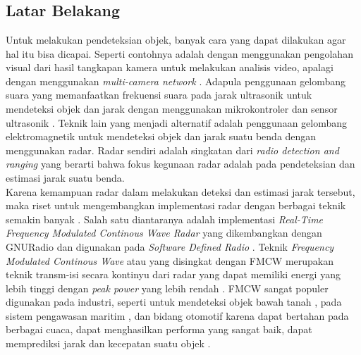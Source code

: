 \chapter{\babSatu}
\section{Latar Belakang}
Untuk melakukan pendeteksian objek, banyak cara yang dapat dilakukan agar hal itu bisa dicapai. Seperti contohnya adalah dengan menggunakan pengolahan visual dari hasil tangkapan kamera untuk melakukan analisis video, apalagi dengan menggunakan \textit{multi-camera network} \cite{Zhang2015}. Adapula penggunaan gelombang suara yang memanfaatkan frekuensi suara pada jarak ultrasonik untuk mendeteksi objek dan jarak dengan menggunakan mikrokontroler dan sensor ultrasonik \cite{Biswas2020}. Teknik lain yang menjadi alternatif adalah penggunaan gelombang elektromagnetik untuk mendeteksi objek dan jarak suatu benda dengan menggunakan radar. Radar sendiri adalah singkatan dari \textit{radio detection and ranging} yang berarti bahwa fokus kegunaan radar adalah pada pendeteksian dan estimasi jarak suatu benda.\\

Karena kemampuan radar dalam melakukan deteksi dan estimasi jarak tersebut, maka riset untuk mengembangkan implementasi radar dengan berbagai teknik semakin banyak \cite{Jia2020,Xia2021,MoraHuaman2020,Sundaresan2015}. Salah satu diantaranya adalah implementasi \textit{Real-Time Frequency Modulated Continous Wave Radar} yang dikembangkan dengan GNURadio dan digunakan pada \textit{Software Defined Radio} \cite{Sundaresan2015}. Teknik \textit{Frequency Modulated Continous Wave} atau yang disingkat dengan FMCW merupakan teknik transm-isi secara kontinyu dari radar yang dapat memiliki energi yang lebih tinggi dengan \textit{peak power} yang lebih rendah \cite{Stasiak2017}. FMCW sangat populer digunakan pada industri, seperti untuk mendeteksi objek bawah tanah \cite{Macasero2018}, pada sistem pengawasan maritim \cite{Lestari2017}, dan bidang otomotif  karena dapat bertahan pada berbagai cuaca, dapat menghasilkan performa yang sangat baik, dapat memprediksi jarak dan kecepatan suatu objek \cite{Deng2017}. \\

